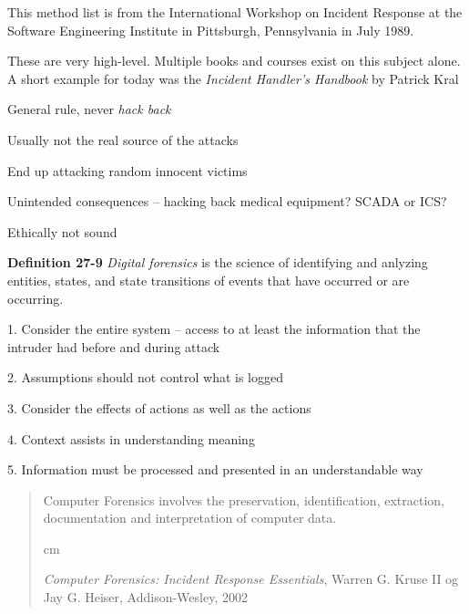 \documentclass[Screen16to9,17pt]{foils}
\begin{document}
This method list is from the International Workshop on Incident Response at the Software Engineering Institute in Pittsburgh, Pennsylvania in July 1989.

These are very high-level. Multiple books and courses exist on this subject alone. A short example for today was the \emph{Incident Handler's Handbook}
by Patrick Kral







\begin{list2}
\item General rule, never \emph{hack back}
\item Usually not the real source of the attacks
\item End up attacking random innocent victims
\item Unintended consequences -- hacking back medical equipment? SCADA or ICS?
\item Ethically not sound
\end{list2}






\begin{list2}
\item {\bf Definition 27-9} \emph{Digital forensics} is the science of identifying and anlyzing entities, states, and state transitions of events that have occurred or are occurring.
\item 1. Consider the entire system -- access to at least the information that the intruder had before and during attack
\item 2. Assumptions should not control what is logged
\item 3. Consider the effects of actions as well as the actions
\item 4. Context assists in understanding meaning
\item 5. Information must be processed and presented in an understandable way
\end{list2}



\vskip 4cm

\begin{quote}
{\hlkbig
Computer Forensics involves the preservation, identification,
extraction, documentation and interpretation of computer data.}

 cm

\emph{Computer Forensics: Incident Response Essentials}, Warren
G. Kruse II og Jay G. Heiser, Addison-Wesley, 2002
\end{quote}
\end{document}
